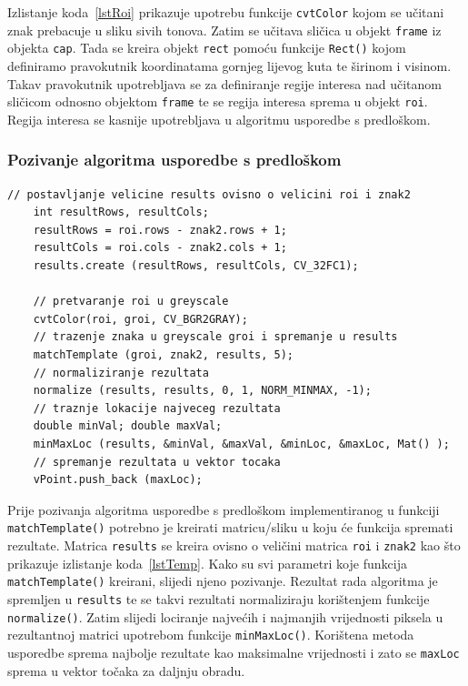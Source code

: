 Izlistanje koda~\ref{lstRoi} prikazuje upotrebu funkcije
\texttt{cvtColor} kojom se učitani znak prebacuje u sliku sivih tonova.
Zatim se učitava sličica u objekt \texttt{frame} iz objekta
\texttt{cap}. Tada se kreira objekt \texttt{rect} pomoću funkcije
\texttt{Rect()} kojom definiramo pravokutnik koordinatama gornjeg
lijevog kuta te širinom i visinom. Takav pravokutnik upotrebljava se za
definiranje regije interesa nad učitanom sličicom odnosno objektom
\texttt{frame} te se regija interesa sprema u objekt \texttt{roi}.
Regija interesa se kasnije upotrebljava u algoritmu usporedbe s
predloškom.


\newpage
\subsubsection{Pozivanje algoritma usporedbe s predloškom} %
\label{ssub:Pozivanje algoritma usporedbe s predloškom}

\begin{lstlisting}[label=lstTemp,caption={Izvorni kod pozivanja
algoritma usporedbe s predloškom}]
    // postavljanje velicine results ovisno o velicini roi i znak2
    int resultRows, resultCols;
    resultRows = roi.rows - znak2.rows + 1;
    resultCols = roi.cols - znak2.cols + 1;
    results.create (resultRows, resultCols, CV_32FC1);

    // pretvaranje roi u greyscale
    cvtColor(roi, groi, CV_BGR2GRAY);      
    // trazenje znaka u greyscale groi i spremanje u results
    matchTemplate (groi, znak2, results, 5);
    // normaliziranje rezultata
    normalize (results, results, 0, 1, NORM_MINMAX, -1);
    // traznje lokacije najveceg rezultata
    double minVal; double maxVal;
    minMaxLoc (results, &minVal, &maxVal, &minLoc, &maxLoc, Mat() );
    // spremanje rezultata u vektor tocaka
    vPoint.push_back (maxLoc);

\end{lstlisting}

Prije pozivanja algoritma usporedbe s predloškom implementiranog u
funkciji \texttt{matchTemplate()} potrebno je kreirati matricu/sliku u
koju će funkcija spremati rezultate. Matrica \texttt{results} se kreira
ovisno o veličini matrica \texttt{roi} i \texttt{znak2} kao što
prikazuje izlistanje koda~\ref{lstTemp}. Kako su svi parametri koje
funkcija \texttt{matchTemplate()} kreirani, slijedi njeno pozivanje.
Rezultat rada algoritma je spremljen u \texttt{results} te se takvi
rezultati normaliziraju korištenjem funkcije \texttt{normalize()}. Zatim
slijedi lociranje najvećih i najmanjih vrijednosti piksela u rezultantnoj
matrici upotrebom funkcije \texttt{minMaxLoc()}. Korištena metoda
usporedbe sprema najbolje rezultate kao maksimalne vrijednosti i zato se
\texttt{maxLoc} sprema u vektor točaka za daljnju obradu.

